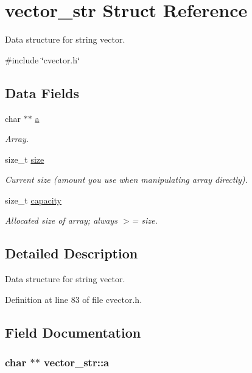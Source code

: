 \hypertarget{structvector__str}{\section{vector\-\_\-str Struct Reference}
\label{structvector__str}
}


Data structure for string vector.  




{\ttfamily \#include \char`\"{}cvector.\-h\char`\"{}}

\subsection*{Data Fields}
\begin{DoxyCompactItemize}
\item 
char $\ast$$\ast$ \hyperlink{structvector__str_aaa28d57e013c0a977fa244cde4261333}{a}
\begin{DoxyCompactList}\small\item\em Array. \end{DoxyCompactList}\item 
size\-\_\-t \hyperlink{structvector__str_a63d4c1a5373481aa4ba9d4ee8252c748}{size}
\begin{DoxyCompactList}\small\item\em Current size (amount you use when manipulating array directly). \end{DoxyCompactList}\item 
size\-\_\-t \hyperlink{structvector__str_a8a52905a505acbcb9176be3eb6cf37f8}{capacity}
\begin{DoxyCompactList}\small\item\em Allocated size of array; always $>$= size. \end{DoxyCompactList}\end{DoxyCompactItemize}


\subsection{Detailed Description}
Data structure for string vector. 



Definition at line 83 of file cvector.\-h.



\subsection{Field Documentation}
\hypertarget{structvector__str_aaa28d57e013c0a977fa244cde4261333}{
\subsubsection[{a}]{\setlength{\rightskip}{0pt plus 5cm}char $\ast$$\ast$ vector\-\_\-str\-::a}}\label{structvector__str_aaa28d57e013c0a977fa244cde4261333}


